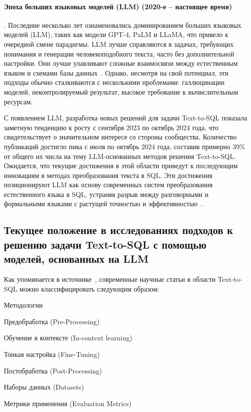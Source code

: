\paragraph{Эпоха больших языковых моделей (LLM) (2020-е -- настоящее время)}. Последние несколько лет
ознаменовались доминированием больших языковых моделей (LLM), таких как модели GPT-4,
PaLM и LLaMA, что привело к очередной смене парадигмы. LLM лучше справляются в задачах, требующих понимания
и генерации человекоподобного текста, часто без дополнительной настройки. Они лучше улавливают
сложные взаимосвязи между естественным языком и схемами базы данных~\cite{zhuLargeLanguageModel2024,
      mohammadjafariNaturalLanguageSQL2025}. Однако, несмотря на свой потенциал, эти подходы обычно сталкиваются с несколькими проблемами:
галлюцинации моделей, неконтролируемый результат, высокое требование к вычислительным ресурсам.

С появлением LLM, разработка новых решений для задачи Text-to-SQL показала
заметную тенденцию к росту с сентября 2023 по октябрь 2024 года,
что свидетельствует о значительном интересе со стороны сообщества.
Количество публикаций достигло пика с июля по октябрь 2024 года,
составив примерно 39\% от общего их числа на тему
LLM-основанных методов решения Text-to-SQL.
Ожидается, что текущие достижения в этой области приведут к последующим инновациям
в методах преобразования текста в SQL. Эти достижения позиционируют LLM как
основу современных систем преобразования естественного языка в SQL,
устраняя разрыв между разговорными и формальными языками с растущей точностью и
эффективностью~\cite{huangExploringLandscapeTexttoSQL2025}.

\subsection{Текущее положение в исследованиях подходов к решению задачи Text-to-SQL
      с помощью моделей, основанных на LLM}

Как упоминается в источнике~\cite{huangExploringLandscapeTexttoSQL2025},
современные научные статьи в области Text-to-SQL можно классифицировать
следующим образом:
\begin{compactitem}
      \item Методологии
      \begin{compactitem}
            \item Предобработка (Pre-Processing)
            \item Обучение в контексте (In-context learning)
            \item Тонкая настройка (Fine-Tuning)
            \item Постобработка (Post-Processing)
      \end{compactitem}
      \item Наборы данных (Datasets)
      \item Метрики применения (Evaluation Metrics)
\end{compactitem}

